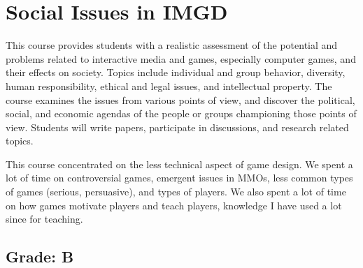 \section{Social Issues in IMGD}

\begin{meta}
\end{meta}


\coursedesc
This course provides students with a realistic assessment of the
potential and problems related to interactive media and games,
especially computer games, and their effects on society. Topics include
individual and group behavior, diversity, human responsibility, ethical
and legal issues, and intellectual property. The course examines the
issues from various points of view, and discover the political, social,
and economic agendas of the people or groups championing those points
of view. Students will write papers, participate in discussions, and
research related topics.

\courseself
This course concentrated on the less technical aspect of game design.
We spent a lot of time on controversial games, emergent issues in MMOs,
less common types of games (serious, persuasive), and types of players.
We also spent a lot of time on how games motivate players and teach
players, knowledge I have used a lot since for teaching.

\subsection*{Grade: B}
